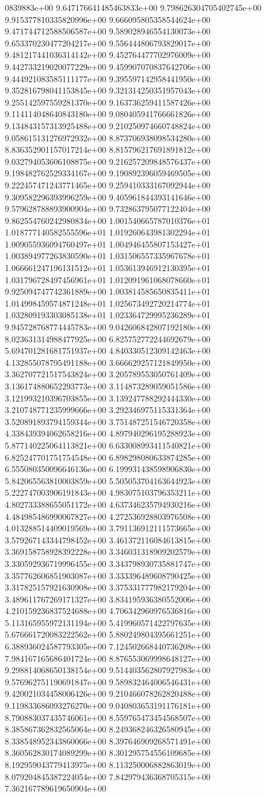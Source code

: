 0839883e+00	9.647176641485463833e+00	9.798626304705402745e+00	9.915377810335820996e+00	9.666095805358544624e+00	9.471744712588506587e+00	9.589028946554130073e+00	9.653370230477204217e+00	9.556444806793829017e+00	9.481217441036314142e+00	9.452764477702976009e+00	9.442733219020077229e+00	9.459907070837642706e+00	9.444921083585111177e+00	9.395597142958441950e+00	9.352816798041153845e+00	9.321314250351957043e+00	9.255142597559281370e+00	9.163736259411587426e+00	9.114114048640843180e+00	9.080405941766661826e+00	9.134843157313925488e+00	9.210250974660748824e+00	9.058615131276972932e+00	8.873706938098534280e+00	8.836352901157017214e+00	8.815796217691891812e+00	9.032794053606108875e+00	9.216257209848576437e+00	9.198482762529334167e+00	9.190892396059469505e+00	9.222457471243771465e+00	9.259410333167092944e+00	9.309582296393996259e+00	9.405961844393141646e+00	9.579628788893900904e+00	9.732863795077122404e+00	9.862554760242980834e+00	1.001540665787010376e+01	1.018777140582555596e+01	1.019260643981302294e+01	1.009055936094760497e+01	1.004946455807153427e+01	1.003894977263830590e+01	1.031506557335967678e+01	1.066661247196131512e+01	1.053613946912130395e+01	1.031796728497456961e+01	1.012091961068078660e+01	9.925094747742361889e+00	1.003814585650835411e+01	1.014998459574871248e+01	1.025673492720214774e+01	1.032809193303085138e+01	1.023364729995236289e+01	9.945728768774445783e+00	9.042606842807192180e+00	8.023631314988477925e+00	6.825752772244692679e+00	5.694701281681751937e+00	4.840330512309142463e+00	4.132855078795491188e+00	3.666629257121849950e+00	3.362707721517543824e+00	3.205789553050761409e+00	3.136174880652293773e+00	3.114873289059051586e+00	3.121993210396703855e+00	3.139247788292444330e+00	3.210748771235999666e+00	3.292346975115331364e+00	3.520891893794159344e+00	3.751487251546720358e+00	4.338439394062658216e+00	4.897940296195288923e+00	5.877140225064113821e+00	6.633008993411540821e+00	6.825247701751754548e+00	6.898298080633874285e+00	6.555080350096646136e+00	6.199931438598906830e+00	5.842065563810003859e+00	5.505053704163644923e+00	5.222747003906191843e+00	4.983075103796353211e+00	4.802733388655051172e+00	4.637346235794930216e+00	4.484985486990067827e+00	4.272536928803976508e+00	4.013288514409019569e+00	3.791136912111573665e+00	3.579267143344798452e+00	3.461372116084613815e+00	3.369158758928392228e+00	3.346031318909202579e+00	3.330592936719996455e+00	3.343798930735881747e+00	3.357762606851903087e+00	3.333396489608790425e+00	3.317825157921630908e+00	3.375331777982179204e+00	3.489611767269171327e+00	3.834195936380552006e+00	4.210159236837524688e+00	4.706342960976536816e+00	5.113165955972131194e+00	5.419960571422797635e+00	5.676661720083222562e+00	5.880249804395661251e+00	6.388936024587793305e+00	7.124502668440736208e+00	7.984167165686401724e+00	8.876553069998648127e+00	9.298814068650138154e+00	9.514403562807927983e+00	9.576962751190691847e+00	9.589832464006546431e+00	9.420021034458006426e+00	9.210466078262820488e+00	9.119833686093276270e+00	9.040803653191176181e+00	8.790883037435746061e+00	8.559765473454568507e+00	8.385867362832565064e+00	8.249368246326580945e+00	8.338548952343860066e+00	8.397646909268571491e+00	8.360562830174089299e+00	8.301295754556109685e+00	8.192959043779413975e+00	8.113250006882863019e+00	8.079204845387224054e+00	7.842979436368705315e+00	7.362167789619650904e+00
